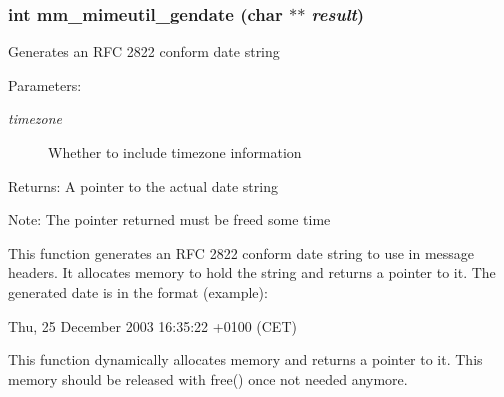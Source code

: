 \subsubsection{\setlength{\rightskip}{0pt plus 5cm}int mm\_\-mimeutil\_\-gendate (char $\ast$$\ast$ {\em result})}\label{mm__mimeutil_8c_a7b7f63b42dfa7a7f907b615aa4cd057}


Generates an RFC 2822 conform date string

\begin{Desc}
\item[Parameters:]
\begin{description}
\item[{\em timezone}]Whether to include timezone information \end{description}
\end{Desc}
\begin{Desc}
\item[Returns:]A pointer to the actual date string \end{Desc}
\begin{Desc}
\item[Note:]The pointer returned must be freed some time\end{Desc}
This function generates an RFC 2822 conform date string to use in message headers. It allocates memory to hold the string and returns a pointer to it. The generated date is in the format (example):

Thu, 25 December 2003 16:35:22 +0100 (CET)

This function dynamically allocates memory and returns a pointer to it. This memory should be released with free() once not needed anymore. 